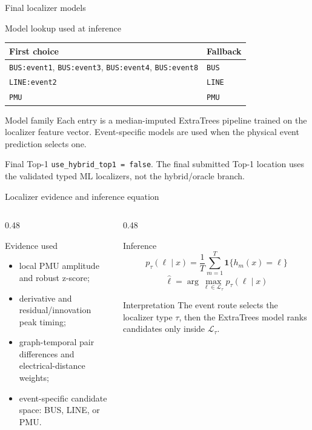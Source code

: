 ﻿\documentclass[10pt,aspectratio=169]{beamer}
\newcommand{\code}[1]{\texttt{\footnotesize #1}}
\begin{document}
\begin{frame}{Final localizer models}
\small
\begin{block}{Model lookup used at inference}
\centering
\begin{tabular}{@{}ll@{}}
\toprule
First choice & Fallback\\
\midrule
\code{BUS:event1}, \code{BUS:event3}, \code{BUS:event4}, \code{BUS:event8} & \code{BUS}\\
\code{LINE:event2} & \code{LINE}\\
\code{PMU} & \code{PMU}\\
\bottomrule
\end{tabular}
\end{block}
\begin{exampleblock}{Model family}
Each entry is a median-imputed ExtraTrees pipeline trained on the localizer feature vector. Event-specific models are used when the physical event prediction selects one.
\end{exampleblock}
\begin{alertblock}{Final Top-1}
\code{use\_hybrid\_top1 = false}. The final submitted Top-1 location uses the validated typed ML localizers, not the hybrid/oracle branch.
\end{alertblock}
\end{frame}

\begin{frame}{Localizer evidence and inference equation}
\small
\begin{columns}[T,totalwidth=\textwidth]
\begin{column}{0.48\textwidth}
\begin{block}{Evidence used}
\begin{itemize}
  \item local PMU amplitude and robust z-score;
  \item derivative and residual/innovation peak timing;
  \item graph-temporal pair differences and electrical-distance weights;
  \item event-specific candidate space: BUS, LINE, or PMU.
\end{itemize}
\end{block}
\end{column}
\begin{column}{0.48\textwidth}
\begin{alertblock}{Inference}
\[
p_\tau(\ell\mid x)=\frac{1}{T}\sum_{m=1}^{T}
\mathbf{1}\{h_m(x)=\ell\}
\]
\[
\hat{\ell}=\arg\max_{\ell\in\mathcal{L}_\tau}p_\tau(\ell\mid x)
\]
\end{alertblock}
\begin{exampleblock}{Interpretation}
The event route selects the localizer type \(\tau\), then the ExtraTrees model ranks candidates only inside \(\mathcal{L}_\tau\).
\end{exampleblock}
\end{column}
\end{columns}
\end{frame}
\end{document}
